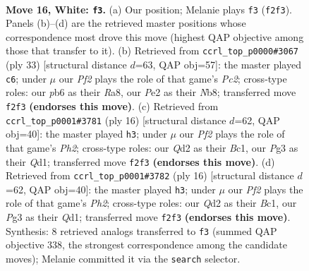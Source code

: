 \documentclass[11pt]{article}
\begin{document}
\clearpage

\begin{figure}[p]\centering
\begin{subfigure}{0.46\textwidth}\centering
\resizebox{\linewidth}{!}{%
\newchessgame
\chessboard[
  setfen={r1bq1r1k/2pn1pb1/1p1p1np1/3P3p/p1P1p3/2N3PB/PPNQPP1P/1RB2RK1 w - - 4 16},
  showmover=false,
  pgfstyle=straightmove, color=movearrow, markmove={f2-f3}
]}
\caption{}
\end{subfigure}\hfill
\begin{subfigure}{0.46\textwidth}\centering
\resizebox{\linewidth}{!}{%
\newchessgame
\chessboard[
  setfen={rn1qr1k1/1bp2pbp/p2p1np1/1p1Pp3/1P2P3/P1P2N1P/2BN1PP1/R1BQR1K1 b - - 0 17},
  showmover=false,
  pgfstyle=straightmove, color=movearrow, markmove={c7-c6}
]}
\caption{}
\end{subfigure}
\\[4pt]
\begin{subfigure}{0.46\textwidth}\centering
\resizebox{\linewidth}{!}{%
\newchessgame
\chessboard[
  setfen={r1bq1rk1/pp1n1pbp/2pp1np1/4p3/2PPP3/2N2NP1/PP3PBP/R1BQ1RK1 w - - 0 9},
  showmover=false,
  pgfstyle=straightmove, color=movearrow, markmove={h2-h3}
]}
\caption{}
\end{subfigure}\hfill
\begin{subfigure}{0.46\textwidth}\centering
\resizebox{\linewidth}{!}{%
\newchessgame
\chessboard[
  setfen={r1bq1rk1/pp1n1pbp/2pp1np1/4p3/2PPP3/2N2NP1/PP3PBP/R1BQ1RK1 w - - 0 9},
  showmover=false,
  pgfstyle=straightmove, color=movearrow, markmove={h2-h3}
]}
\caption{}
\end{subfigure}
\caption{\textbf{Move 16, White: \texttt{f3}.} (a) Our position; Melanie plays \texttt{f3} (\texttt{f2f3}). Panels (b)--(d) are the retrieved master positions whose correspondence most drove this move (highest QAP objective among those that transfer to it). (b) Retrieved from \texttt{ccrl\_top\_p0000\#3067} (ply 33) [structural distance $d$=63, QAP obj=57]: the master played \texttt{c6}; under $\mu$ our \emph{Pf2} plays the role of that game's \emph{Pc2}; cross-type roles: our \emph{p}b6 as their \emph{R}a8, our \emph{P}e2 as their \emph{N}b8; transferred move \texttt{f2f3} \textbf{(endorses this move)}. (c) Retrieved from \texttt{ccrl\_top\_p0001\#3781} (ply 16) [structural distance $d$=62, QAP obj=40]: the master played \texttt{h3}; under $\mu$ our \emph{Pf2} plays the role of that game's \emph{Ph2}; cross-type roles: our \emph{Q}d2 as their \emph{B}c1, our \emph{P}g3 as their \emph{Q}d1; transferred move \texttt{f2f3} \textbf{(endorses this move)}. (d) Retrieved from \texttt{ccrl\_top\_p0001\#3782} (ply 16) [structural distance $d$=62, QAP obj=40]: the master played \texttt{h3}; under $\mu$ our \emph{Pf2} plays the role of that game's \emph{Ph2}; cross-type roles: our \emph{Q}d2 as their \emph{B}c1, our \emph{P}g3 as their \emph{Q}d1; transferred move \texttt{f2f3} \textbf{(endorses this move)}. Synthesis: 8 retrieved analogs transferred to \texttt{f3} (summed QAP objective 338, the strongest correspondence among the candidate moves); Melanie committed it via the \texttt{search} selector.}
\label{fig:thought-m30}
\end{figure}
\end{document}
